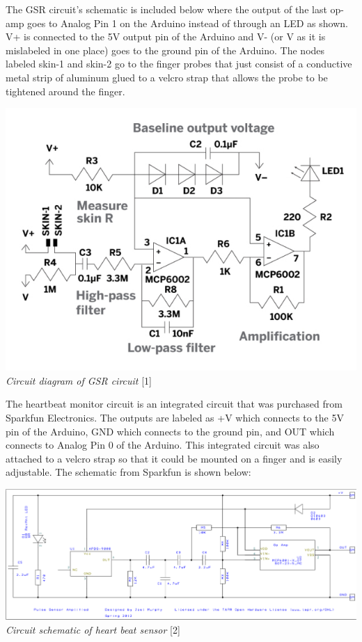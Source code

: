 \documentclass[finalProposal.tex]{subfiles}
\begin{document}
\onehalfspacing


\bigskip

The GSR circuit's schematic is included below where the output of the last op-amp goes to Analog Pin 1 on the Arduino instead of through an LED as shown. V+ is connected to the 5V output pin of 
the Arduino and V- (or V as it is mislabeled in one place) goes to the ground pin of the Arduino. The nodes labeled skin-1 and skin-2 go to the finger probes that just consist of a conductive metal 
strip of aluminum glued to a velcro strap that allows the probe to be tightened around the finger.

\begin{center}
\includegraphics[scale=0.5]{gsrCircuit.jpg} \\
\emph{Circuit diagram of GSR circuit} [1]
\end{center}

The heartbeat monitor circuit is an integrated circuit that was purchased from Sparkfun Electronics. The outputs are labeled as +V which connects to the 5V pin of the Arduino, GND which connects to
the ground pin, and OUT which connects to Analog Pin 0 of the Arduino. This integrated circuit was also attached to a velcro strap so that it could be mounted on a finger and is easily adjustable. 
The schematic from Sparkfun is shown below:

\begin{center}
\includegraphics[scale=0.4]{pulseSensorSchematic.PNG} \\
\emph{Circuit schematic of heart beat sensor} [2]
\end{center}
\end{document}

